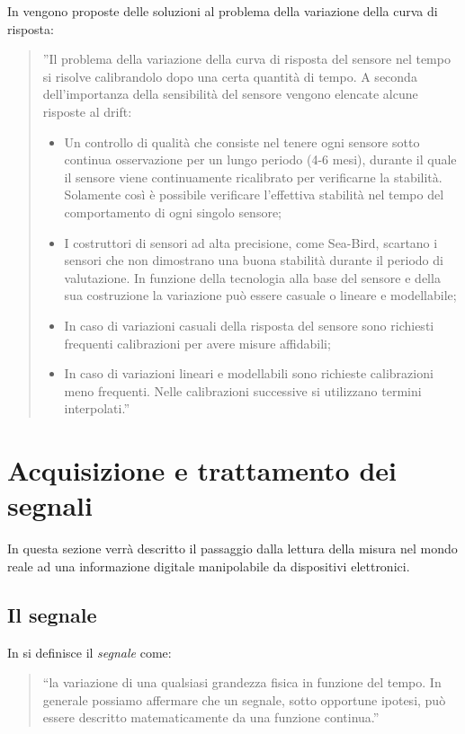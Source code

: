\documentclass[a4paper]{report} %
\begin{document}
In \cite{art:rif.15} vengono proposte delle soluzioni al problema della variazione della curva di risposta:
\begin{quote}
	''Il problema della variazione della curva di risposta del sensore nel tempo si risolve calibrandolo dopo una certa quantità di tempo. A seconda dell'importanza della sensibilità del sensore vengono elencate alcune risposte al drift:
	\begin{itemize}
		\item Un controllo di qualità che consiste nel tenere ogni sensore sotto continua osservazione per un lungo periodo (4-6 mesi), durante il quale il sensore viene continuamente ricalibrato per verificarne la stabilità. Solamente così è possibile verificare l'effettiva stabilità nel tempo del comportamento di ogni singolo sensore;
		\item I costruttori di sensori ad alta precisione, come Sea-Bird, scartano i sensori che non dimostrano una buona stabilità durante il periodo di valutazione. In funzione della tecnologia alla base del sensore e della sua costruzione la variazione può essere casuale o lineare e modellabile;
		\item In caso di variazioni casuali della risposta del sensore sono richiesti frequenti calibrazioni per avere misure affidabili;
		\item In caso di variazioni lineari e modellabili sono richieste calibrazioni meno frequenti. Nelle calibrazioni successive si utilizzano termini interpolati.''  
	\end{itemize}
\end{quote}

\section{Acquisizione e trattamento dei segnali}
In questa sezione verrà descritto il passaggio dalla lettura della misura nel mondo reale ad una informazione digitale manipolabile da dispositivi elettronici.

\subsection{Il segnale}

In \cite{art:rif.2} si definisce il \textit{segnale} come:
\begin{quote}
	``la variazione di una qualsiasi grandezza fisica in funzione del tempo. In generale possiamo affermare che un segnale, sotto opportune ipotesi, può essere descritto matematicamente da una funzione continua.''
\end{quote}
\end{document}

